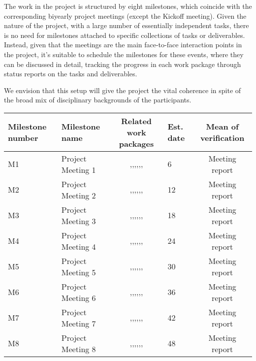 
The work in the \TheProject project is structured by eight milestones,
which coincide with the corresponding biyearly project meetings
(except the Kickoff meeting). Given the nature of the project, with a
large number of essentially independent tasks, there is no need for
milestones attached to specific collections of tasks or
deliverables. Instead, given that the meetings are the main
face-to-face interaction points in the project, it's suitable to
schedule the milestones for these events, where they can be discussed
in detail, tracking the progress in each work package through status
reports on the tasks and deliverables.

We envision that this setup will give the project the vital coherence
in spite of the broad mix of disciplinary backgrounds of the
participants.

\newcommand{\WPall}{\WPref{management},\WPref{dissem},\WPref{component-architecture},\WPref{UI},\WPref{hpc},\WPref{dksbases},\WPref{social-aspects}}

\begin{center}
  \begin{tabular}{|m{8ex}|m{15ex}|c|m{3ex}|c|}
    \hline
    Milestone number & Milestone name & Related work packages &
    Est. date & Mean of verification\\\hline
    M1 & Project Meeting 1 & \WPall & 6  & Meeting report\\\hline
    M2 & Project Meeting 2 & \WPall & 12 & Meeting report\\\hline
    M3 & Project Meeting 3 & \WPall & 18 & Meeting report\\\hline
    M4 & Project Meeting 4 & \WPall & 24 & Meeting report\\\hline
    M5 & Project Meeting 5 & \WPall & 30 & Meeting report\\\hline
    M6 & Project Meeting 6 & \WPall & 36 & Meeting report\\\hline
    M7 & Project Meeting 7 & \WPall & 42 & Meeting report\\\hline
    M8 & Project Meeting 8 & \WPall & 48 & Meeting report\\\hline
  \end{tabular}
\end{center}


